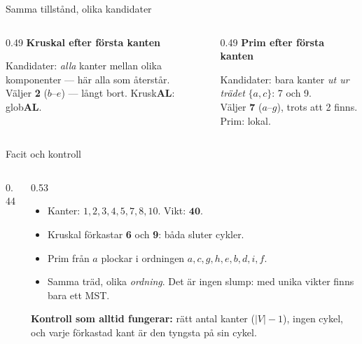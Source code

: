 \begin{frame}{Samma tillstånd, olika kandidater}
\begin{columns}[T]
\begin{column}{0.49\textwidth}
\centering
{\small\bfseries\color{kthblue}Kruskal efter första kanten}\par\smallskip
\par
\footnotesize Kandidater: \emph{alla} kanter mellan olika komponenter — här alla som återstår.\\
Väljer \textbf{2} ($b$--$e$) — långt bort. Krusk\textbf{AL}: glob\textbf{AL}.
\end{column}
\begin{column}{0.49\textwidth}
\centering
{\small\bfseries\color{kthblue}Prim efter första kanten}\par\smallskip
\par
\footnotesize Kandidater: bara kanter \emph{ut ur trädet} $\{a,c\}$: 7 och 9.\\
Väljer \textbf{7} ($a$--$g$), trots att 2 finns. Prim: lokal.
\end{column}
\end{columns}
\end{frame}



\begin{frame}{Facit och kontroll}
\begin{columns}[T]
\begin{column}{0.44\textwidth}
\centering

\end{column}
\begin{column}{0.53\textwidth}
\small
\begin{itemize}\setlength{\itemsep}{3pt}
  \item Kanter: $1,2,3,4,5,7,8,10$. \quad Vikt: $\mathbf{40}$.
  \item Kruskal förkastar \textbf{6} och \textbf{9}: båda sluter cykler.
  \item Prim från $a$ plockar i ordningen $a,c,g,h,e,b,d,i,f$.
  \item Samma träd, olika \emph{ordning}. Det är ingen slump: med unika vikter
        finns bara ett MST.
\end{itemize}
\begin{ahabox}
\textbf{Kontroll som alltid fungerar:} rätt antal kanter ($|V|-1$), ingen cykel,
och varje förkastad kant är den tyngsta på sin cykel.
\end{ahabox}
\end{column}
\end{columns}
\end{frame}


